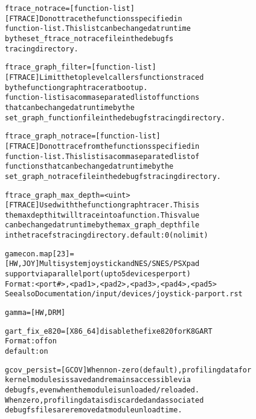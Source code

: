 \documentclass[a4paper,8pt,english]{sphinxmanual}
\begin{document}
\begin{alltt}
        ftrace\_notrace={[}function-list{]}
                        {[}FTRACE{]} Do not trace the functions specified in
                        function-list. This list can be changed at run time
                        by the set\_ftrace\_notrace file in the debugfs
                        tracing directory.

        ftrace\_graph\_filter={[}function-list{]}
                        {[}FTRACE{]} Limit the top level callers functions traced
                        by the function graph tracer at boot up.
                        function-list is a comma separated list of functions
                        that can be changed at run time by the
                        set\_graph\_function file in the debugfs tracing directory.

        ftrace\_graph\_notrace={[}function-list{]}
                        {[}FTRACE{]} Do not trace from the functions specified in
                        function-list.  This list is a comma separated list of
                        functions that can be changed at run time by the
                        set\_graph\_notrace file in the debugfs tracing directory.

        ftrace\_graph\_max\_depth=\textless{}uint\textgreater{}
                        {[}FTRACE{]} Used with the function graph tracer. This is
                        the max depth it will trace into a function. This value
                        can be changed at run time by the max\_graph\_depth file
                        in the tracefs tracing directory. default: 0 (no limit)

        gamecon.map{[}2\textbar{}3{]}=
                        {[}HW,JOY{]} Multisystem joystick and NES/SNES/PSX pad
                        support via parallel port (up to 5 devices per port)
                        Format: \textless{}port\#\textgreater{},\textless{}pad1\textgreater{},\textless{}pad2\textgreater{},\textless{}pad3\textgreater{},\textless{}pad4\textgreater{},\textless{}pad5\textgreater{}
                        See also Documentation/input/devices/joystick-parport.rst

        gamma=          {[}HW,DRM{]}

        gart\_fix\_e820=  {[}X86\_64{]} disable the fix e820 for K8 GART
                        Format: off \textbar{} on
                        default: on

        gcov\_persist=   {[}GCOV{]} When non-zero (default), profiling data for
                        kernel modules is saved and remains accessible via
                        debugfs, even when the module is unloaded/reloaded.
                        When zero, profiling data is discarded and associated
                        debugfs files are removed at module unload time.


\end{alltt}
\end{document}
